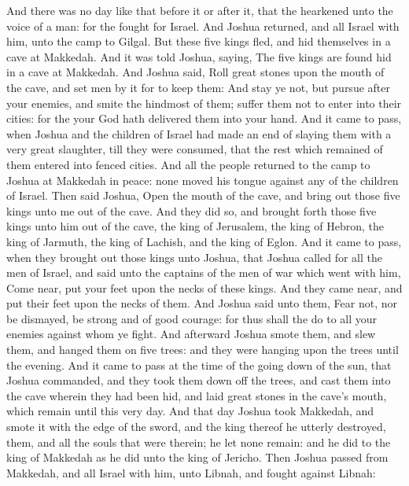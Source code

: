 \begin{biblechapter}
\verse And there was no day like that before it or after it, that the \LORD hearkened unto the voice of a man: for the \LORD fought for Israel.
\verse And Joshua returned, and all Israel with him, unto the camp to Gilgal.
 But these five kings fled, and hid themselves in a cave at Makkedah.
\verse And it was told Joshua, saying, The five kings are found hid in a cave at Makkedah.
\verse And Joshua said, Roll great stones upon the mouth of the cave, and set men by it for to keep them:
\verse And stay ye not, but pursue after your enemies, and smite the hindmost of them; suffer them not to enter into their cities: for the \LORD your God hath delivered them into your hand.
\verse And it came to pass, when Joshua and the children of Israel had made an end of slaying them with a very great slaughter, till they were consumed, that the rest which remained of them entered into fenced cities.
\verse And all the people returned to the camp to Joshua at Makkedah in peace: none moved his tongue against any of the children of Israel.
\verse Then said Joshua, Open the mouth of the cave, and bring out those five kings unto me out of the cave.
\verse And they did so, and brought forth those five kings unto him out of the cave, the king of Jerusalem, the king of Hebron, the king of Jarmuth, the king of Lachish, and the king of Eglon.
\verse And it came to pass, when they brought out those kings unto Joshua, that Joshua called for all the men of Israel, and said unto the captains of the men of war which went with him, Come near, put your feet upon the necks of these kings. And they came near, and put their feet upon the necks of them.
\verse And Joshua said unto them, Fear not, nor be dismayed, be strong and of good courage: for thus shall the \LORD do to all your enemies against whom ye fight.
\verse And afterward Joshua smote them, and slew them, and hanged them on five trees: and they were hanging upon the trees until the evening.
\verse And it came to pass at the time of the going down of the sun, that Joshua commanded, and they took them down off the trees, and cast them into the cave wherein they had been hid, and laid great stones in the cave's mouth, which remain until this very day.
\vfill\columnbreak %
 And that day Joshua took Makkedah, and smote it with the edge of the sword, and the king thereof he utterly destroyed, them, and all the souls that were therein; he let none remain: and he did to the king of Makkedah as he did unto the king of Jericho.
\verse Then Joshua passed from Makkedah, and all Israel with him, unto Libnah, and fought against Libnah:

\end{biblechapter}
